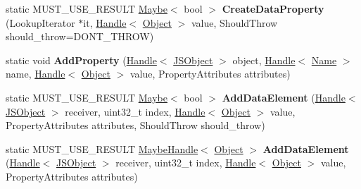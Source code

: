 \begin{DoxyCompactItemize}
\item 
static M\+U\+S\+T\+\_\+\+U\+S\+E\+\_\+\+R\+E\+S\+U\+LT \hyperlink{classv8_1_1_maybe}{Maybe}$<$ bool $>$ {\bfseries Create\+Data\+Property} (Lookup\+Iterator $\ast$it, \hyperlink{classv8_1_1internal_1_1_handle}{Handle}$<$ \hyperlink{classv8_1_1internal_1_1_object}{Object} $>$ value, Should\+Throw should\+\_\+throw=D\+O\+N\+T\+\_\+\+T\+H\+R\+OW)\hypertarget{classv8_1_1internal_1_1_j_s_object_a9fe1f08d836063e4e80bc198fe7dd2b9}{}\label{classv8_1_1internal_1_1_j_s_object_a9fe1f08d836063e4e80bc198fe7dd2b9}

\item 
static void {\bfseries Add\+Property} (\hyperlink{classv8_1_1internal_1_1_handle}{Handle}$<$ \hyperlink{classv8_1_1internal_1_1_j_s_object}{J\+S\+Object} $>$ object, \hyperlink{classv8_1_1internal_1_1_handle}{Handle}$<$ \hyperlink{classv8_1_1internal_1_1_name}{Name} $>$ name, \hyperlink{classv8_1_1internal_1_1_handle}{Handle}$<$ \hyperlink{classv8_1_1internal_1_1_object}{Object} $>$ value, Property\+Attributes attributes)\hypertarget{classv8_1_1internal_1_1_j_s_object_a577162bbe82b155ae2320d0c6aa5bfa8}{}\label{classv8_1_1internal_1_1_j_s_object_a577162bbe82b155ae2320d0c6aa5bfa8}

\item 
static M\+U\+S\+T\+\_\+\+U\+S\+E\+\_\+\+R\+E\+S\+U\+LT \hyperlink{classv8_1_1_maybe}{Maybe}$<$ bool $>$ {\bfseries Add\+Data\+Element} (\hyperlink{classv8_1_1internal_1_1_handle}{Handle}$<$ \hyperlink{classv8_1_1internal_1_1_j_s_object}{J\+S\+Object} $>$ receiver, uint32\+\_\+t index, \hyperlink{classv8_1_1internal_1_1_handle}{Handle}$<$ \hyperlink{classv8_1_1internal_1_1_object}{Object} $>$ value, Property\+Attributes attributes, Should\+Throw should\+\_\+throw)\hypertarget{classv8_1_1internal_1_1_j_s_object_a81442dd7d443232806c3c7cf78f744d4}{}\label{classv8_1_1internal_1_1_j_s_object_a81442dd7d443232806c3c7cf78f744d4}

\item 
static M\+U\+S\+T\+\_\+\+U\+S\+E\+\_\+\+R\+E\+S\+U\+LT \hyperlink{classv8_1_1internal_1_1_maybe_handle}{Maybe\+Handle}$<$ \hyperlink{classv8_1_1internal_1_1_object}{Object} $>$ {\bfseries Add\+Data\+Element} (\hyperlink{classv8_1_1internal_1_1_handle}{Handle}$<$ \hyperlink{classv8_1_1internal_1_1_j_s_object}{J\+S\+Object} $>$ receiver, uint32\+\_\+t index, \hyperlink{classv8_1_1internal_1_1_handle}{Handle}$<$ \hyperlink{classv8_1_1internal_1_1_object}{Object} $>$ value, Property\+Attributes attributes)\hypertarget{classv8_1_1internal_1_1_j_s_object_a98c84418adbcc57c5cad4128b48d57a2}{}\label{classv8_1_1internal_1_1_j_s_object_a98c84418adbcc57c5cad4128b48d57a2}


\end{DoxyCompactItemize}
